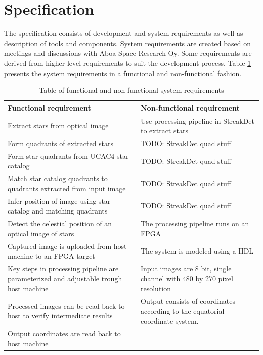 \documentclass[12pt]{report}
\begin{document}
\section{Specification}

The specification consists of development and system requirements as well as description of tools and components. System requirements are created based on meetings and discussions with Aboa Space Research Oy. Some requirements are derived from higher level requirements to suit the development process. Table \ref{table:1} presents the system requirements in a functional and non-functional fashion.

\begin{table}
    \begin{tabular}{|p{6.75cm}|p{6.75cm}|}
        \hline
        \textbf{Functional requirement} & \textbf{Non-functional requirement} \\
        \hline
        \hline
        Extract stars from optical image & Use processing pipeline in StreakDet to extract stars \\
        \hline
        Form quadrants of extracted stars & TODO: StreakDet quad stuff \\
        \hline
        Form star quadrants from UCAC4 star catalog & TODO: StreakDet quad stuff \\
        \hline
        Match star catalog quadrants to quadrants extracted from input image & TODO: StreakDet quad stuff \\
        \hline
        Infer position of image using star catalog and matching quadrants & TODO: StreakDet quad stuff \\
        \hline
        Detect the celestial position of an optical image of stars & The processing pipeline runs on an FPGA \\
        \hline
        Captured image is uploaded from host machine to an FPGA target & The system is modeled using a HDL \\
        \hline
        Key steps in processing pipeline are parameterized and adjustable trough host machine & Input images are 8 bit, single channel with 480 by 270 pixel resolution \\
        \hline
        Processed images can be read back to host to verify intermediate results & Output consists of coordinates according to the equatorial coordinate system. \\
        \hline
        Output coordinates are read back to host machine & \\
        \hline
    \end{tabular}
    \caption{Table of functional and non-functional system requirements}
    \label{table:1}
\end{table}
\end{document}
